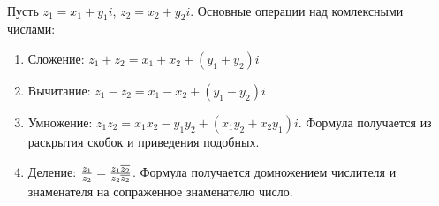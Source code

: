 \documentclass{article}
\begin{document}
	\paragraph{} Пусть \( z_1 = x_1 + y_1i \), \( z_2 = x_2 + y_2i \). Основные операции над комлексными числами:
	\begin{enumerate}
		\item Сложение: \( 
			z_1 + z_2 = x_1 + x_2 + (y_1 + y_2)i 
			\)
		\item Вычитание: \( 
			z_1 - z_2 = x_1 - x_2 + (y_1 - y_2)i 
			\)
		\item Умножение: \( 
			z_1 z_2 = x_1 x_2 - y_1 y_2 + (x_1 y_2 + x_2 y_1)i
			\). 
			Формула получается из раскрытия скобок и приведения подобных.
		\item Деление: \(
			{z_1 \over z_2} = {{z_1 \overline{z_2}} \over {z_2 \overline{z_2}}} 
		\). Формула получается домножением числителя и знаменателя на сопраженное знаменателю число.
	\end{enumerate}
	
	
\end{document}
